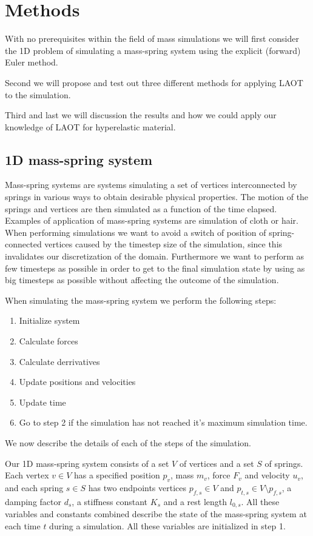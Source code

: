 \documentclass[11pt]{article}
\begin{document}

\section{Methods}
\label{sec:methods}

With no prerequisites within the field of mass simulations we will first
consider the 1D problem of simulating a mass-spring system using the explicit
(forward) Euler method.

Second we will propose and test out three different methods for applying LAOT
to the simulation.

Third and last we will discussion the results and how we could apply our
knowledge of LAOT for hyperelastic material.

\subsection{1D mass-spring system} Mass-spring systems are systems simulating
a set of vertices interconnected by springs in various ways to obtain
desirable physical properties. The motion of the springs and vertices are
then simulated as a function of the time elapsed. Examples of application of
mass-spring systems are simulation of cloth or hair. When performing simulations
we want to avoid a switch of position of spring-connected vertices caused by the
timestep size of the simulation, since this invalidates our discretization of
the domain. Furthermore we want to perform as few timesteps as possible in order
to get to the final simulation state by using as big timesteps as possible
without affecting the outcome of the simulation.

When simulating the mass-spring system we perform the following steps:
\begin{enumerate} \item Initialize system \item Calculate forces \item
Calculate derrivatives \item Update positions and velocities \item Update time
\item Go to step 2 if the simulation has not reached it's maximum simulation
time. \end{enumerate} We now describe the details of each of the steps of
the simulation.

Our 1D mass-spring system consists of a set $V$ of vertices and a set
$S$ of springs. Each vertex $v \in V$ has a specified position $p_v$,
mass $m_v$, force $F_v$ and velocity $u_v$, and each spring $s \in S$
has two endpoints vertices $p_{f,s} \in V$ and $p_{t,s} \in V \setminus
p_{f,s}$, a damping factor $d_s$, a stiffness constant $K_s$ and a rest length
$l_{0,s}$. All these variables and constants combined describe the state
of the mass-spring system at each time $t$ during a simulation. All these
variables are initialized in step 1.
\end{document}

